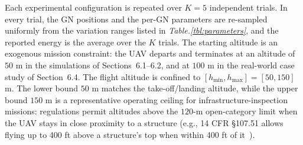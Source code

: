 Each experimental configuration is repeated over $K = 5$ independent trials.
In every trial, the GN positions and the per-GN parameters are re-sampled uniformly from the variation ranges listed in \textit{Table.\ref{tbl:parameters}}, and the reported energy is the average over the $K$ trials.
The starting altitude is an exogenous mission constraint: the UAV departs and terminates at an altitude of $50$ m in the simulations of Sections~6.1--6.2, and at $100$ m in the real-world case study of Section~6.4.
The flight altitude is confined to $[h_{\min}, h_{\max}]=[50,150]$ m. The lower bound $50$ m matches the take-off/landing altitude, while the upper bound $150$ m is a representative operating ceiling for infrastructure-inspection missions: regulations permit altitudes above the $120$-m open-category limit when the UAV stays in close proximity to a structure (e.g., 14 CFR \S 107.51 allows flying up to 400 ft above a structure's top when within 400 ft of it~\cite{FAA-Part-107}).

